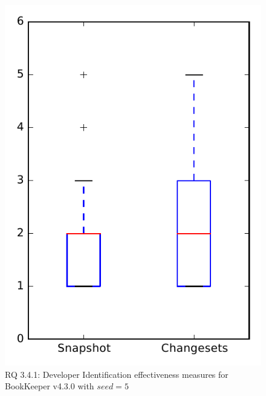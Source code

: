 
\begin{figure}
\centering
\includegraphics[height=0.4\textheight]{figures/dit_seed/rq1_bookkeeper_5}
\caption{RQ 3.4.1: Developer Identification effectiveness measures for BookKeeper v4.3.0 with $seed=5$}
\label{fig:dit_seed:rq1:bookkeeper}
\end{figure}
